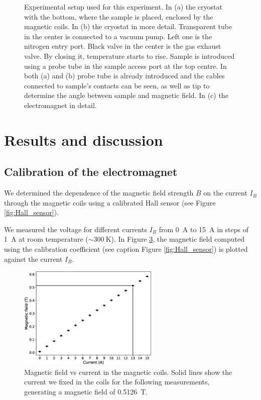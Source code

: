 \documentclass[11pt,a4paper]{article}
\begin{document}
\begin{figure}[H]
\begin{subfigure}[b]{0.5\textwidth}
\caption{}
\label{fig:electromagnet}
\end{subfigure}
\caption{Experimental setup used for this experiment. In (a) the cryostat with the bottom, where the sample is placed, enclosed by the magnetic coils. In (b) the cryostat in more detail. Transparent tube in the center is connected to a vacuum pump. Left one is the nitrogen entry port. Black valve in the center is the gas exhaust valve. By closing it, temperature starts to rise. Sample is introduced using a probe tube in the sample access port at the top centre. In both (a) and (b) probe tube is already introduced and the cables connected to sample's contacts can be seen, as well as tip to determine the angle between sample and magnetic field. In (c) the electromagnet in detail.}
\label{fig:experimental_setup_all}
\end{figure}

\newpage
\section{Results and discussion}

\subsection{Calibration of the electromagnet}

We determined the dependence of the magnetic field strength $B$ on the current $I_B$ through the magnetic coils using a calibrated Hall sensor (see Figure \ref{fig:Hall_sensor}).

We measured the voltage for different currents $I_B$ from \SI{0}{\ampere} to \SI{15}{\ampere} in steps of \SI{1}{\ampere} at room temperature ($\sim\SI{300}{\kelvin}$). In Figure \ref{fig:magnetic_field}, the magnetic field computed using the calibration coefficient (see caption Figure \ref{fig:Hall_sensor}) is plotted against the current $I_B$.

\begin{figure}[H]
\centering
\includegraphics[width=0.6\textwidth]{Magnetic_field_vs_current.eps}
\caption{Magnetic field vs current in the magnetic coils. Solid lines show the current we fixed in the coils for the following measurements, generating a magnetic field of \SI{0.5126}{\tesla}.}
\label{fig:magnetic_field}
\end{figure}
\end{document}
